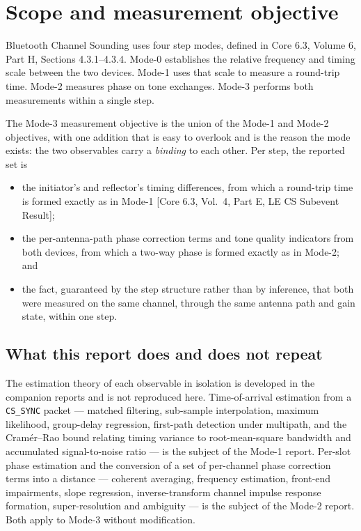 \documentclass[11pt,a4paper]{article}
\newcommand{\code}[1]{\texttt{\small #1}}
\newcommand{\core}[1]{\textcolor{rulegrey}{\small[Core 6.3, #1]}}
\begin{document}
\newpage
\tableofcontents
\newpage
{}
\setcounter{page}{1}

\section{Scope and measurement objective}

Bluetooth Channel Sounding uses four step modes, defined in Core 6.3, Volume 6, Part H,
Sections 4.3.1--4.3.4. Mode-0 establishes the relative frequency and timing scale between the two
devices. Mode-1 uses that scale to measure a round-trip time. Mode-2 measures phase on tone
exchanges. Mode-3 performs both measurements within a single step.

The Mode-3 measurement objective is the union of the Mode-1 and Mode-2 objectives, with one addition
that is easy to overlook and is the reason the mode exists: the two observables carry a
\emph{binding} to each other. Per step, the reported set is

\begin{itemize}[leftmargin=1.4em,itemsep=1pt]
  \item the initiator's and reflector's timing differences, from which a round-trip time is formed
        exactly as in Mode-1 \core{Vol.\ 4, Part E, LE CS Subevent Result};
  \item the per-antenna-path phase correction terms and tone quality indicators from both devices,
        from which a two-way phase is formed exactly as in Mode-2; and
  \item the fact, guaranteed by the step structure rather than by inference, that both were measured
        on the same channel, through the same antenna path and gain state, within one step.
\end{itemize}

\subsection{What this report does and does not repeat}

The estimation theory of each observable in isolation is developed in the companion reports and is
not reproduced here. Time-of-arrival estimation from a \code{CS\_SYNC} packet --- matched filtering,
sub-sample interpolation, maximum likelihood, group-delay regression, first-path detection under
multipath, and the Cram\'er--Rao bound relating timing variance to root-mean-square bandwidth and
accumulated signal-to-noise ratio --- is the subject of the Mode-1 report. Per-slot phase estimation
and the conversion of a set of per-channel phase correction terms into a distance --- coherent
averaging, frequency estimation, front-end impairments, slope regression, inverse-transform channel
impulse response formation, super-resolution and ambiguity --- is the subject of the Mode-2 report.
Both apply to Mode-3 without modification.
\end{document}

